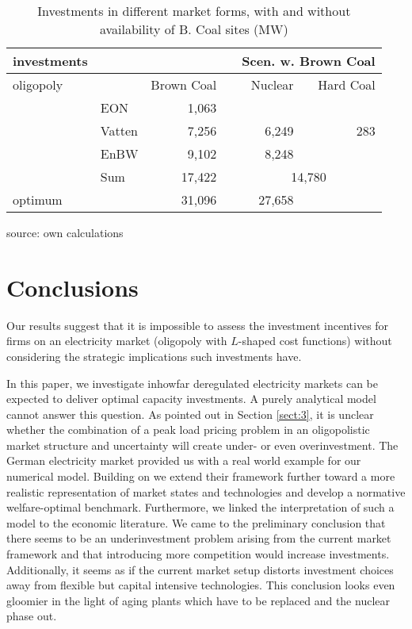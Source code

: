 \begin{table}
\centering
\caption{Investments in different market forms, with and without availability of B. Coal sites (MW)}
\begin{tabular}{llrrrr}
\hline
\hline
investments &            &            &            & \multicolumn{ 2}{r}{Scen. w. Brown Coal} \\
\hline
 oligopoly &            & Brown Coal &            &    Nuclear &  Hard Coal \\
\hline
           &        EON &       1,063 &            &            &            \\
           &     Vatten &       7,256 &            &       6,249 &        283 \\
           &       EnBW &       9,102 &            &       8,248 &            \\
           &        Sum &      17,422 &            & \multicolumn{ 2}{c}{14,780} \\
\hline
   optimum &            &      31,096 &            &      27,658 &            \\
\hline
\hline
\end{tabular}  

\label{tab:invest}
\begin{center}
source: own calculations
\end{center}
\end{table}

\section{Conclusions}

Our results suggest that it is impossible to assess the investment incentives for firms on an electricity market (oligopoly with $L$-shaped cost functions) without considering the strategic implications such investments have.

In this paper, we investigate inhowfar deregulated electricity markets can be expected to deliver optimal capacity investments. A purely analytical model cannot answer this question. As pointed out in Section \ref{sect:3}, it is unclear whether the combination of a peak load pricing problem in an oligopolistic market structure and uncertainty will create under- or even overinvestment. The German electricity market provided us with a real world example for our numerical model. Building on \cite{Genc2007} we extend their framework further toward a more realistic representation of market states and technologies and develop a normative welfare-optimal benchmark. Furthermore, we linked the interpretation of such a model to the economic literature. We came to the preliminary conclusion that there seems to be an underinvestment problem arising from the current market framework and that introducing more competition would increase investments. Additionally, it seems as if the current market setup distorts investment choices away from flexible but capital intensive technologies. This conclusion looks even gloomier in the light of aging plants which have to be replaced and the nuclear phase out.

